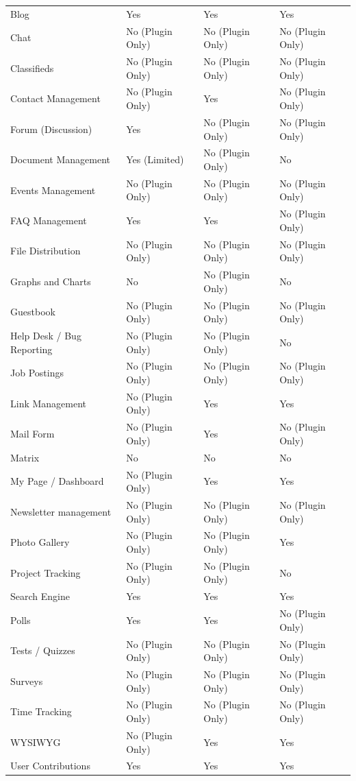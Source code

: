 \documentclass[12pt]{report}
\begin{document}
\begin{longtable}[H]{|| p{.3\linewidth} | p{.19\linewidth} | p{.19\linewidth} | p{.19\linewidth} ||}
Blog & Yes & Yes & Yes \\
Chat & No (Plugin Only) & No (Plugin Only) & No (Plugin Only) \\
Classifieds & No (Plugin Only) & No (Plugin Only) & No (Plugin Only) \\
Contact Management & No (Plugin Only) & Yes & No (Plugin Only) \\
Forum (Discussion) & Yes & No (Plugin Only) & No (Plugin Only) \\
Document Management & Yes (Limited) & No (Plugin Only) & No \\
Events Management & No (Plugin Only) & No (Plugin Only) & No (Plugin Only) \\
FAQ Management & Yes & Yes & No (Plugin Only) \\
File Distribution & No (Plugin Only) & No (Plugin Only) & No (Plugin Only) \\
Graphs and Charts & No & No (Plugin Only) & No \\
Guestbook & No (Plugin Only) & No (Plugin Only) & No (Plugin Only) \\
Help Desk / Bug Reporting & No (Plugin Only) & No (Plugin Only) & No \\
Job Postings & No (Plugin Only) & No (Plugin Only) & No (Plugin Only) \\
Link Management & No (Plugin Only) & Yes & Yes \\
Mail Form & No (Plugin Only) & Yes & No (Plugin Only) \\
Matrix & No & No & No \\
My Page / Dashboard & No (Plugin Only) & Yes & Yes \\
Newsletter management & No (Plugin Only) & No (Plugin Only) & No (Plugin Only) \\
Photo Gallery & No (Plugin Only) & No (Plugin Only) & Yes \\
Project Tracking & No (Plugin Only) & No (Plugin Only) & No \\
Search Engine & Yes & Yes & Yes \\
Polls & Yes & Yes & No (Plugin Only) \\
Tests / Quizzes & No (Plugin Only) & No (Plugin Only) & No (Plugin Only) \\
Surveys & No (Plugin Only) & No (Plugin Only) & No (Plugin Only) \\
Time Tracking & No (Plugin Only) & No (Plugin Only) & No (Plugin Only) \\
WYSIWYG & No (Plugin Only) & Yes & Yes \\
User Contributions & Yes & Yes & Yes \\

\end{longtable}
\end{document}
